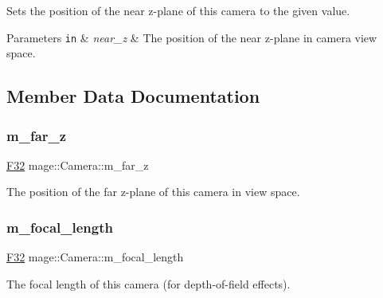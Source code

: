 Sets the position of the near z-\/plane of this camera to the given value.


\begin{DoxyParams}[1]{Parameters}
\mbox{\tt in}  & {\em near\+\_\+z} & The position of the near z-\/plane in camera view space. \\
\hline
\end{DoxyParams}


\subsection{Member Data Documentation}
\hypertarget{classmage_1_1_camera_a1073445c77b3224cd62613ae83853fe3}{}\label{classmage_1_1_camera_a1073445c77b3224cd62613ae83853fe3} 
\subsubsection{\texorpdfstring{m\+\_\+far\+\_\+z}{m\_far\_z}}
{\footnotesize\ttfamily \hyperlink{namespacemage_aa97e833b45f06d60a0a9c4fc22ae02c0}{F32} mage\+::\+Camera\+::m\+\_\+far\+\_\+z\hspace{0.3cm}{\ttfamily [private]}}

The position of the far z-\/plane of this camera in view space. \hypertarget{classmage_1_1_camera_a53b5a143e193bb11bf02e29543016cc3}{}\label{classmage_1_1_camera_a53b5a143e193bb11bf02e29543016cc3} 
\subsubsection{\texorpdfstring{m\+\_\+focal\+\_\+length}{m\_focal\_length}}
{\footnotesize\ttfamily \hyperlink{namespacemage_aa97e833b45f06d60a0a9c4fc22ae02c0}{F32} mage\+::\+Camera\+::m\+\_\+focal\+\_\+length\hspace{0.3cm}{\ttfamily [private]}}

The focal length of this camera (for depth-\/of-\/field effects). \hypertarget{classmage_1_1_camera_a289dcf02aaa00853aba15189b47cd6d9}{}\label{classmage_1_1_camera_a289dcf02aaa00853aba15189b47cd6d9} 
